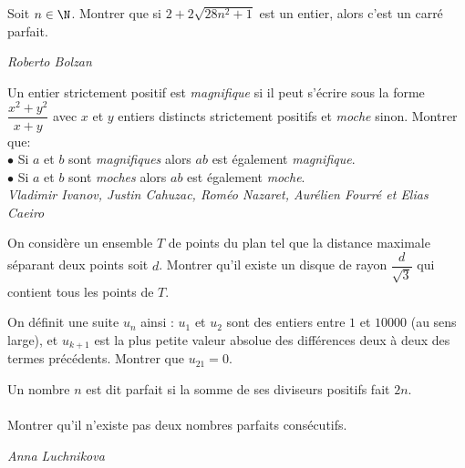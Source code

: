 \begin{exo}{}
Soit $n \in \N$. Montrer que si $2+2\sqrt{28n^2+1}$ est un entier, alors c'est un carré parfait.

\medskip
\textit{Roberto Bolzan}
\end{exo}



\begin{exo}{}
Un entier strictement positif est \textit{magnifique} si il peut s'écrire sous la forme $\dfrac{x^2+y^2}{x+y}$ avec $x$ et $y$ entiers distincts strictement positifs et \textit{moche} sinon. Montrer que:\\
$\bullet$ Si $a$ et $b$ sont \textit{magnifiques} alors $ab$ est également  \textit{magnifique}.\\
$\bullet$ Si $a$ et $b$ sont \textit{moches} alors $ab$ est également \textit{moche}.\\

\medskip
\textit{Vladimir Ivanov, Justin Cahuzac, Roméo Nazaret, Aurélien Fourré et Elias Caeiro}

\end{exo}



\begin{exo}{}
On considère un ensemble $T$ de points du plan tel que la distance maximale séparant deux points soit $d$. Montrer qu'il existe un disque de rayon $\dfrac{d}{\sqrt{3}}$ qui contient tous les points de $T$.
\end{exo}




\begin{exo}{}On définit une suite $u_{n}$ ainsi : $u_{1}$ et $u_{2}$ sont des entiers entre $1$ et $10000$ (au sens large), et $u_{k+1}$
est la plus petite valeur absolue des différences deux à deux des termes précédents. Montrer que
$u_{21} = 0$.

\end{exo}


\begin{exo}{}
Un nombre $n$ est dit parfait si la somme de ses diviseurs positifs fait $2n$.\\~~\\
Montrer qu'il n'existe pas deux nombres parfaits consécutifs.

\medskip
\textit{Anna Luchnikova}

\end{exo}



